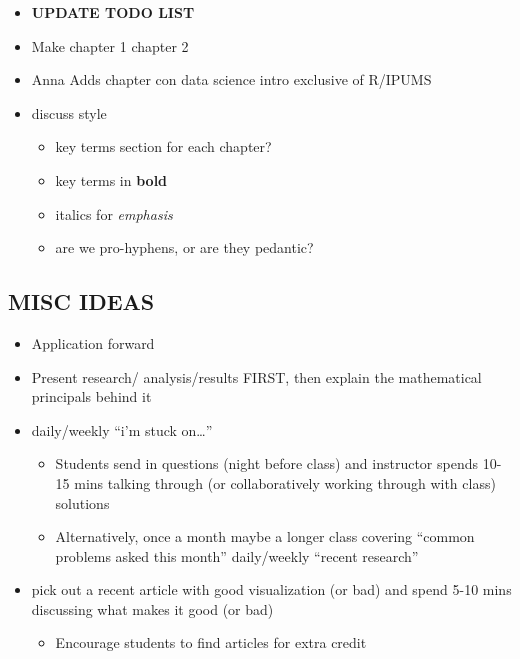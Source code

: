 \documentclass[
]{book}
\providecommand{\tightlist}{%
  \setlength{\itemsep}{0pt}\setlength{\parskip}{0pt}}
\begin{document}
\begin{itemize}
\item
  \textbf{UPDATE TODO LIST}
\item
  Make chapter 1 chapter 2
\item
  Anna Adds chapter con data science intro exclusive of R/IPUMS
\item
  discuss style

  \begin{itemize}
  \tightlist
  \item
    key terms section for each chapter?
  \item
    key terms in \textbf{bold}
  \item
    italics for \emph{emphasis}
  \item
    are we pro-hyphens, or are they pedantic?
  \end{itemize}
\end{itemize}

\hypertarget{misc-ideas}{%
\subsection*{MISC IDEAS}\label{misc-ideas}}

\begin{itemize}
\tightlist
\item
  Application forward
\item
  Present research/ analysis/results FIRST, then explain the mathematical principals behind it
\item
  daily/weekly ``i'm stuck on\ldots{}''

  \begin{itemize}
  \tightlist
  \item
    Students send in questions (night before class) and instructor spends 10-15 mins talking through (or collaboratively working through with class) solutions
  \item
    Alternatively, once a month maybe a longer class covering ``common problems asked this month''
    daily/weekly ``recent research''
  \end{itemize}
\item
  pick out a recent article with good visualization (or bad) and spend 5-10 mins discussing what makes it good (or bad)

  \begin{itemize}
  \tightlist
  \item
    Encourage students to find articles for extra credit
  \end{itemize}
\end{itemize}
\end{document}
